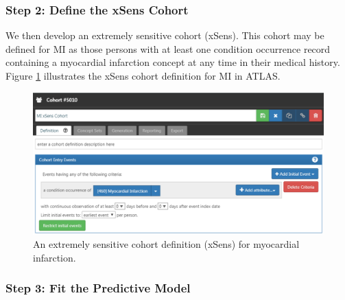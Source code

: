 \documentclass[11pt]{book}
\theoremstyle{definition}
\theoremstyle{definition}
\theoremstyle{definition}
\theoremstyle{remark}
\begin{document}
\subsubsection*{Step 2: Define the xSens
Cohort}\label{step-2-define-the-xsens-cohort}

We then develop an extremely sensitive cohort (xSens). This cohort may
be defined for MI as those persons with at least one condition
occurrence record containing a myocardial infarction concept at any time
in their medical history. Figure \ref{fig:xSens} illustrates the xSens
cohort definition for MI in ATLAS. 

\begin{figure}

{\centering \includegraphics[width=1\linewidth]{images/ClinicalValidity/xSens} 

}

\caption{An extremely sensitive cohort definition (xSens) for myocardial infarction.}\label{fig:xSens}
\end{figure}

\subsubsection*{Step 3: Fit the Predictive
Model}\label{step-3-fit-the-predictive-model}
\end{document}

